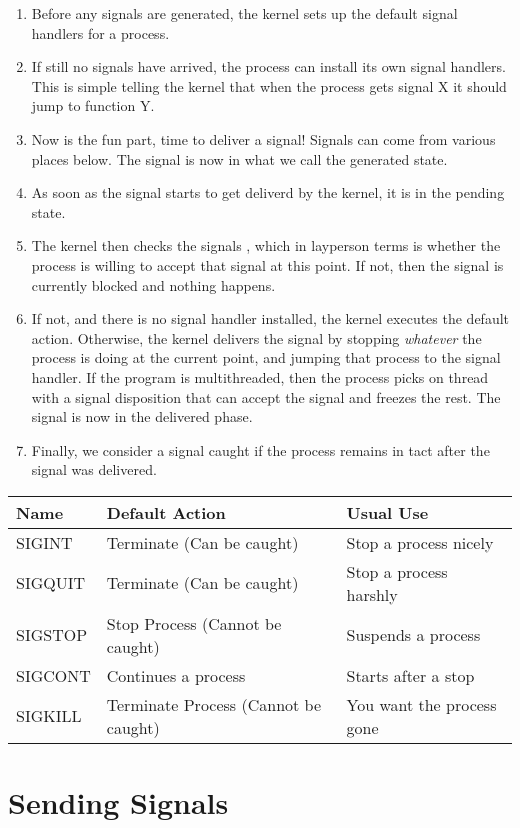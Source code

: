 \begin{enumerate}
\item Before any signals are generated, the kernel sets up the default signal handlers for a process.
\item If still no signals have arrived, the process can install its own signal handlers. This is simple telling the kernel that when the process gets signal X it should jump to function Y.
\item Now is the fun part, time to deliver a signal! Signals can come from various places below. The signal is now in what we call the generated state.
\item As soon as the signal starts to get deliverd by the kernel, it is in the pending state.
\item The kernel then checks the signals , which in layperson terms is whether the process is willing to accept that signal at this point. If not, then the signal is currently blocked and nothing happens.
\item If not, and there is no signal handler installed, the kernel executes the default action. Otherwise, the kernel delivers the signal by stopping \textit{whatever} the process is doing at the current point, and jumping that process to the signal handler. If the program is multithreaded, then the process picks on thread with a signal disposition that can accept the signal and freezes the rest. The signal is now in the delivered phase.
\item Finally, we consider a signal caught if the process remains in tact after the signal was delivered.
\end{enumerate}

\begin{tabular}{|l|l|l|}
Name & Default Action & Usual Use \\ \hline
SIGINT & Terminate (Can be caught) & Stop a process nicely \\
SIGQUIT & Terminate (Can be caught) & Stop a process harshly \\
SIGSTOP & Stop Process (Cannot be caught) & Suspends a process \\
SIGCONT & Continues a process & Starts after a stop \\
SIGKILL & Terminate Process (Cannot be caught) & You want the process gone \\
\end{tabular}

\section{Sending Signals}

